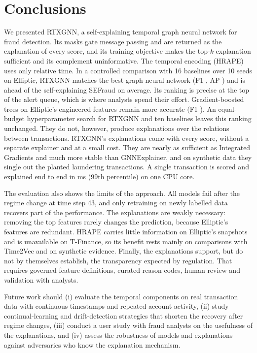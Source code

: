 \section{Conclusions}
\label{sec:conclusions}

We presented RTXGNN, a self-explaining temporal graph neural network for fraud detection. Its masks gate message passing and are returned as the explanation of every score, and its training objective makes the top-$k$ explanation sufficient and its complement uninformative. The temporal encoding (HRAPE) uses only relative time. In a controlled comparison with 16 baselines over 10 seeds on Elliptic, RTXGNN matches the best graph neural network (F1 \rtxFone, AP \rtxAP) and is ahead of the self-explaining SEFraud on average. Its ranking is precise at the top of the alert queue, which is where analysts spend their effort. Gradient-boosted trees on Elliptic's engineered features remain more accurate (F1 \xgbFone). An equal-budget hyperparameter search for RTXGNN and ten baselines leaves this ranking unchanged. They do not, however, produce explanations over the relations between transactions. RTXGNN's explanations come with every score, without a separate explainer and at a small cost. They are nearly as sufficient as Integrated Gradients and much more stable than GNNExplainer, and on synthetic data they single out the planted laundering transactions. A single transaction is scored and explained end to end in \rtxLatBoneP{} ms (99th percentile) on one CPU core.

The evaluation also shows the limits of the approach. All models fail after the regime change at time step 43, and only retraining on newly labelled data recovers part of the performance. The explanations are weakly necessary: removing the top features rarely changes the prediction, because Elliptic's features are redundant. HRAPE carries little information on Elliptic's snapshots and is unavailable on T-Finance, so its benefit rests mainly on comparisons with Time2Vec and on synthetic evidence. Finally, the explanations support, but do not by themselves establish, the transparency expected by regulation. That requires governed feature definitions, curated reason codes, human review and validation with analysts.

Future work should (i) evaluate the temporal components on real transaction data with continuous timestamps and repeated account activity, (ii) study continual-learning and drift-detection strategies that shorten the recovery after regime changes, (iii) conduct a user study with fraud analysts on the usefulness of the explanations, and (iv) assess the robustness of models and explanations against adversaries who know the explanation mechanism.
